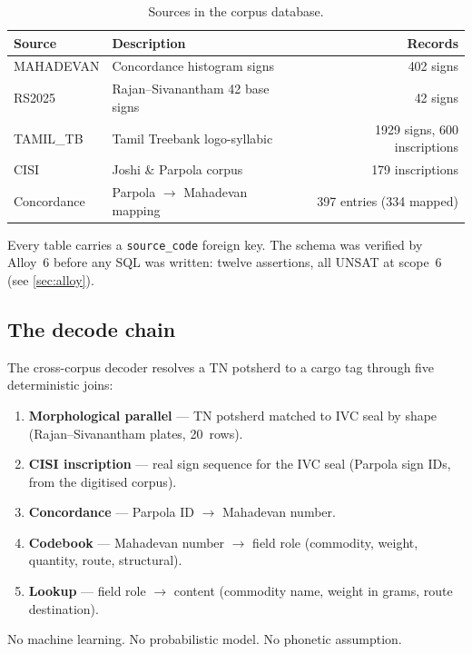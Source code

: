 \begin{longtable}{@{}llr@{}}
\caption{Sources in the corpus database.}
\label{tab:sources}\\
\toprule
Source & Description & Records \\
\midrule
\endfirsthead
\bottomrule
\endlastfoot
MAHADEVAN & Concordance histogram signs & \num{402} signs \\
\midrule
RS2025 & Rajan--Sivanantham 42 base signs & \num{42} signs \\
\midrule
TAMIL\_TB & Tamil Treebank logo-syllabic & \num{1929} signs, \num{600} inscriptions \\
\midrule
CISI & Joshi \& Parpola corpus\smartcite{JoshiParpola1987}\smartcite{MayigCISI}
     & \num{179} inscriptions \\
\midrule
Concordance & Parpola $\to$ Mahadevan mapping & \num{397} entries (\num{334} mapped) \\
\end{longtable}

\noindent
Every table carries a \texttt{source\_code} foreign key.
The schema was verified by Alloy~6 before any SQL was written:
twelve assertions, all UNSAT at scope~6
(see \cref{sec:alloy}).

\subsection{The decode chain}

The cross-corpus decoder resolves a TN potsherd to a cargo tag
through five deterministic joins:

\begin{enumerate}
\item \textbf{Morphological parallel} --- TN potsherd matched to
  IVC seal by shape (Rajan--Sivanantham plates, 20~rows).
\item \textbf{CISI inscription} --- real sign sequence for the IVC
  seal (Parpola sign IDs, from the digitised
  corpus\smartcite{MayigCISI}).
\item \textbf{Concordance} --- Parpola ID $\to$ Mahadevan
  number.\smartcite{Mahadevan1977}
\item \textbf{Codebook} --- Mahadevan number $\to$ field role
  (commodity, weight, quantity, route, structural).
\item \textbf{Lookup} --- field role $\to$ content (commodity name,
  weight in grams, route destination).
\end{enumerate}

\noindent
No machine learning. No probabilistic model. No phonetic assumption.

